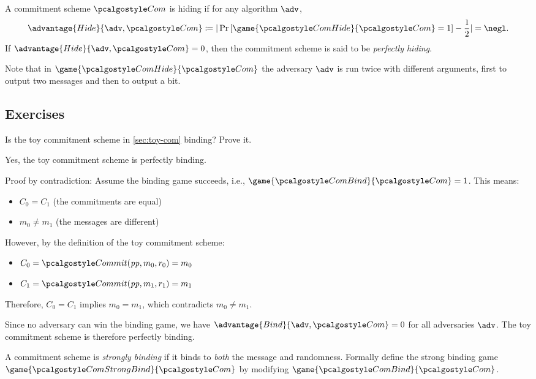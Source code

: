 \begin{definition}[Hiding]
  A commitment scheme $\algo{Com}$ is hiding if for any \ppt algorithm $\adv$,
 \[
  \advantage{Hide}{\adv, \algo{Com}} \defeq |\pr{\game{\algo{ComHide}}{\algo{Com}} = 1} - \frac{1}{2}| = \negl.
 \]
 If $\advantage{Hide}{\adv, \algo{Com}} = 0$, then the commitment scheme is said to be \emph{perfectly hiding}.
\end{definition}

Note that in $\game{\algo{ComHide}}{\algo{Com}}$ the adversary $\adv$ is run twice with different arguments, first to output two messages and then to output a bit.

\subsection{Exercises}

\begin{exercise}
  Is the toy commitment scheme in \cref{sec:toy-com} binding?
  Prove it.
\end{exercise}

\ifsolutions
\begin{mysolution}
  Yes, the toy commitment scheme is perfectly binding.
  
  Proof by contradiction: Assume the binding game succeeds, i.e., $\game{\algo{ComBind}}{\algo{Com}} = 1$.
  This means:
  \begin{itemize}
    \item $C_0 = C_1$ (the commitments are equal)
    \item $m_0 \neq m_1$ (the messages are different)
  \end{itemize}
  
  However, by the definition of the toy commitment scheme:
  \begin{itemize}
    \item $C_0 = \algo{Commit}(\params, m_0, r_0) = m_0$
    \item $C_1 = \algo{Commit}(\params, m_1, r_1) = m_1$
  \end{itemize}
  
  Therefore, $C_0 = C_1$ implies $m_0 = m_1$, which contradicts $m_0 \neq m_1$.
  
  Since no adversary can win the binding game, we have $\advantage{Bind}{\adv, \algo{Com}} = 0$ for all adversaries $\adv$.
  The toy commitment scheme is therefore perfectly binding.
\end{mysolution}
\fi

\begin{exercise}
  A commitment scheme is \emph{strongly binding} if it binds to \emph{both} the message and randomness.
  Formally define the strong binding game $\game{\algo{ComStrongBind}}{\algo{Com}}$ by modifying $\game{\algo{ComBind}}{\algo{Com}}$.
\end{exercise}

